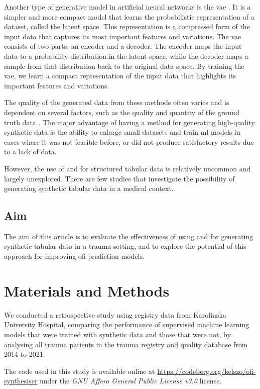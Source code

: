 \documentclass[12pt, letterpaper]{article}
\begin{document}
Another type of generative model in artificial neural networks is the \acrfull{vae} \cite{kingma_auto-encoding_2013}. It is a simpler and more compact model that learns the probabilistic representation of a dataset, called the latent space. This representation is a compressed form of the input data that captures its most important features and variations. The \acrshort{vae} consists of two parts: an encoder and a decoder. The encoder maps the input data to a probability distribution in the latent space, while the decoder maps a sample from that distribution back to the original data space. By training the \acrshort{vae}, we learn a compact representation of the input data that highlights its important features and variations.

The quality of the generated data from these methods often varies and is dependent on several factors, such as the quality and quantity of the ground truth data \cite{karras_training_2020}.  The major advantage of having a method for generating high-quality synthetic data is the ability to enlarge small datasets and train \acrshort{ml}  models in cases where it was not feasible before, or did not produce satisfactory results due to a lack of data.

However, the use of  and  for structured tabular data is relatively uncommon and largely unexplored. There are few studies that investigate the possibility of generating synthetic tabular data in a medical context.

\subsection{Aim}
The aim of this article is to evaluate the effectiveness of using  and  for generating synthetic tabular data in a trauma setting, and to explore the potential of this approach for improving \acrshort{ofi} prediction models.

\section{Materials and Methods}
We conducted a retrospective study using registry data from Karolinska University Hospital, comparing the performance of supervised machine learning models that were trained with synthetic data and those that were not, by analysing all trauma patients in the trauma registry and quality database from 2014 to 2021.

The code used in this study is available online at \url{https://codeberg.org/kelszo/ofi-synthesiser} under the \textit{GNU Affero General Public License v3.0} license.
\end{document}
